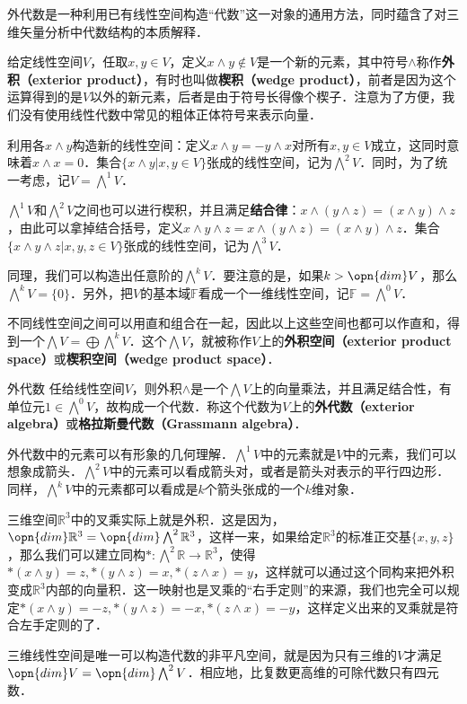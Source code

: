 

外代数是一种利用已有线性空间构造“代数”这一对象的通用方法，同时蕴含了对三维矢量分析中代数结构的本质解释．


给定线性空间$V$，任取$x, y\in V$，定义$x\wedge y\not\in V$是一个新的元素，其中符号$\wedge$称作\textbf{外积（exterior product）}，有时也叫做\textbf{楔积（wedge product）}，前者是因为这个运算得到的是$V$以外的新元素，后者是由于符号长得像个楔子．注意为了方便，我们没有使用线性代数中常见的粗体正体符号来表示向量．

利用各$x\wedge y$构造新的线性空间：定义$x\wedge y=-y\wedge x$对所有$x, y\in V$成立，这同时意味着$x\wedge x=0$．集合$\{x\wedge y|x, y\in V\}$张成的线性空间，记为$\bigwedge^2 V$．同时，为了统一考虑，记$V=\bigwedge^1 V$．

$\bigwedge^1 V$和$\bigwedge^2 V$之间也可以进行楔积，并且满足\textbf{结合律}：$x\wedge(y\wedge z)=(x\wedge y)\wedge z$，由此可以拿掉结合括号，定义$x\wedge y\wedge z=x\wedge(y\wedge z)=(x\wedge y)\wedge z$．集合$\{x\wedge y\wedge z|x, y, z\in V\}$张成的线性空间，记为$\bigwedge^3 V$．

同理，我们可以构造出任意阶的$\bigwedge^k V$．要注意的是，如果$k>\opn{dim} V$，那么$\bigwedge^k V=\{0\}$．另外，把$V$的基本域$\mathbb{F}$看成一个一维线性空间，记$\mathbb{F}=\bigwedge^0 V$．

不同线性空间之间可以用直和组合在一起，因此以上这些空间也都可以作直和，得到一个$\bigwedge V=\bigoplus\bigwedge^k V$．这个$\bigwedge V$，就被称作$V$上的\textbf{外积空间（exterior product space）}或\textbf{楔积空间（wedge product space）}．

\begin{theorem}{外代数}
任给线性空间$V$，则外积$\wedge$是一个$\bigwedge V$上的向量乘法，并且满足结合性，有单位元$1\in \bigwedge^0 V$，故构成一个代数．称这个代数为$V$上的\textbf{外代数（exterior algebra）}或\textbf{格拉斯曼代数（Grassmann algebra）}．
\end{theorem}

外代数中的元素可以有形象的几何理解．$\bigwedge^1 V$中的元素就是$V$中的元素，我们可以想象成箭头．$\bigwedge^2 V$中的元素可以看成箭头对，或者是箭头对表示的平行四边形．同样，$\bigwedge^k V$中的元素都可以看成是$k$个箭头张成的一个$k$维对象．

三维空间$\mathbb{R}^3$中的叉乘实际上就是外积．这是因为，$\opn{dim}\mathbb{R}^3=\opn{dim}\bigwedge^2\mathbb{R}^3$，这样一来，如果给定$\mathbb{R}^3$的标准正交基$\{x, y, z\}$，那么我们可以建立同构$*: \bigwedge^2\mathbb{R}\rightarrow\mathbb{R}^3$，使得$*(x\wedge y)=z, *(y\wedge z)=x, *(z\wedge x)=y$，这样就可以通过这个同构来把外积变成$\mathbb{R}^3$内部的向量积．这一映射也是叉乘的“右手定则”的来源，我们也完全可以规定$*(x\wedge y)=-z, *(y\wedge z)=-x, *(z\wedge x)=-y$，这样定义出来的叉乘就是符合左手定则的了．

三维线性空间是唯一可以构造代数的非平凡空间，就是因为只有三维的$V$才满足$\opn{dim}V=\opn{dim}\bigwedge^2V$．相应地，比复数更高维的可除代数只有四元数．
